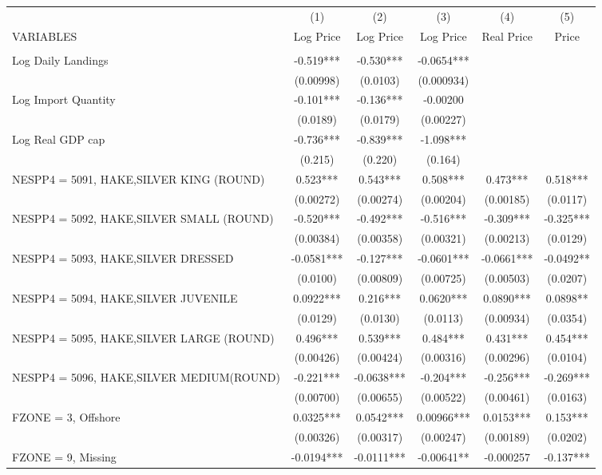 \begin{tabular}{lccccc} \hline
 & (1) & (2) & (3) & (4) & (5) \\
VARIABLES & Log Price & Log Price & Log Price & Real Price & Price \\ \hline
 &  &  &  &  &  \\
Log Daily Landings & -0.519*** & -0.530*** & -0.0654*** &  &  \\
 & (0.00998) & (0.0103) & (0.000934) &  &  \\
Log Import Quantity & -0.101*** & -0.136*** & -0.00200 &  &  \\
 & (0.0189) & (0.0179) & (0.00227) &  &  \\
Log Real GDP cap & -0.736*** & -0.839*** & -1.098*** &  &  \\
 & (0.215) & (0.220) & (0.164) &  &  \\
NESPP4 = 5091, HAKE,SILVER KING (ROUND) & 0.523*** & 0.543*** & 0.508*** & 0.473*** & 0.518*** \\
 & (0.00272) & (0.00274) & (0.00204) & (0.00185) & (0.0117) \\
NESPP4 = 5092, HAKE,SILVER SMALL (ROUND) & -0.520*** & -0.492*** & -0.516*** & -0.309*** & -0.325*** \\
 & (0.00384) & (0.00358) & (0.00321) & (0.00213) & (0.0129) \\
NESPP4 = 5093, HAKE,SILVER DRESSED & -0.0581*** & -0.127*** & -0.0601*** & -0.0661*** & -0.0492** \\
 & (0.0100) & (0.00809) & (0.00725) & (0.00503) & (0.0207) \\
NESPP4 = 5094, HAKE,SILVER JUVENILE & 0.0922*** & 0.216*** & 0.0620*** & 0.0890*** & 0.0898** \\
 & (0.0129) & (0.0130) & (0.0113) & (0.00934) & (0.0354) \\
NESPP4 = 5095, HAKE,SILVER LARGE (ROUND) & 0.496*** & 0.539*** & 0.484*** & 0.431*** & 0.454*** \\
 & (0.00426) & (0.00424) & (0.00316) & (0.00296) & (0.0104) \\
NESPP4 = 5096, HAKE,SILVER MEDIUM(ROUND) & -0.221*** & -0.0638*** & -0.204*** & -0.256*** & -0.269*** \\
 & (0.00700) & (0.00655) & (0.00522) & (0.00461) & (0.0163) \\
FZONE = 3, Offshore & 0.0325*** & 0.0542*** & 0.00966*** & 0.0153*** & 0.153*** \\
 & (0.00326) & (0.00317) & (0.00247) & (0.00189) & (0.0202) \\
FZONE = 9, Missing & -0.0194*** & -0.0111*** & -0.00641** & -0.000257 & -0.137*** \\

\end{tabular}
